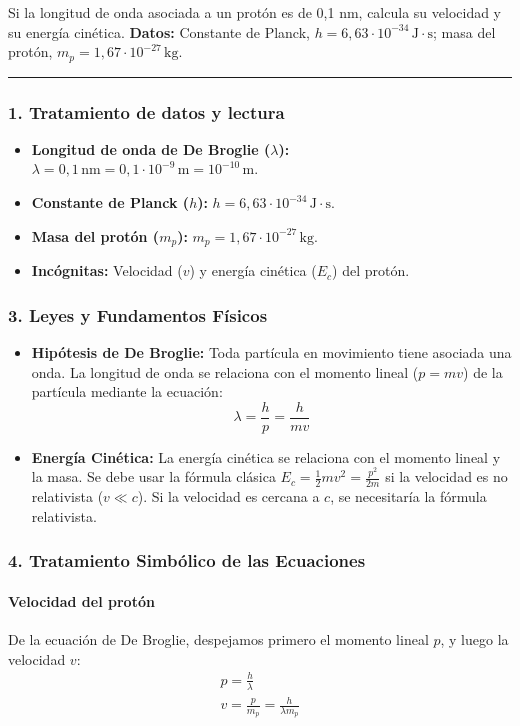 \begin{cajaenunciado}
Si la longitud de onda asociada a un protón es de 0,1 nm, calcula su velocidad y su energía cinética.
\textbf{Datos:} Constante de Planck, $h=6,63\cdot10^{-34}\,\text{J}\cdot\text{s}$; masa del protón, $m_{p}=1,67\cdot10^{-27}\,\text{kg}$.
\end{cajaenunciado}
\hrule

\subsubsection*{1. Tratamiento de datos y lectura}
\begin{itemize}
    \item \textbf{Longitud de onda de De Broglie ($\lambda$):} $\lambda = 0,1\,\text{nm} = 0,1 \cdot 10^{-9}\,\text{m} = 10^{-10}\,\text{m}$.
    \item \textbf{Constante de Planck ($h$):} $h = 6,63 \cdot 10^{-34}\,\text{J}\cdot\text{s}$.
    \item \textbf{Masa del protón ($m_p$):} $m_p = 1,67 \cdot 10^{-27}\,\text{kg}$.
    \item \textbf{Incógnitas:} Velocidad ($v$) y energía cinética ($E_c$) del protón.
\end{itemize}

\subsubsection*{3. Leyes y Fundamentos Físicos}
\begin{itemize}
    \item \textbf{Hipótesis de De Broglie:} Toda partícula en movimiento tiene asociada una onda. La longitud de onda se relaciona con el momento lineal ($p=mv$) de la partícula mediante la ecuación:
    $$ \lambda = \frac{h}{p} = \frac{h}{mv} $$
    \item \textbf{Energía Cinética:} La energía cinética se relaciona con el momento lineal y la masa. Se debe usar la fórmula clásica $E_c = \frac{1}{2}mv^2 = \frac{p^2}{2m}$ si la velocidad es no relativista ($v \ll c$). Si la velocidad es cercana a $c$, se necesitaría la fórmula relativista.
\end{itemize}

\subsubsection*{4. Tratamiento Simbólico de las Ecuaciones}
\paragraph{Velocidad del protón}
De la ecuación de De Broglie, despejamos primero el momento lineal $p$, y luego la velocidad $v$:
\begin{gather}
    p = \frac{h}{\lambda} \\
    v = \frac{p}{m_p} = \frac{h}{\lambda m_p}
\end{gather}

